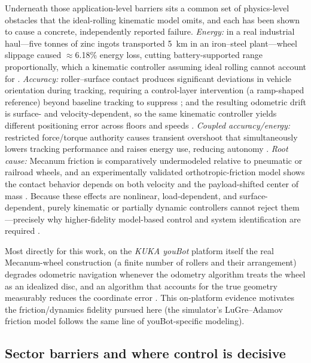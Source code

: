 \documentclass[11pt]{article}
\begin{document}
Underneath those application-level barriers sits a common set of physics-level
obstacles that the ideal-rolling kinematic model omits, and each has been shown to
cause a concrete, independently reported failure. \emph{Energy:} in a real
industrial haul---five tonnes of zinc ingots transported 5~km in an iron--steel
plant---wheel slippage caused $\approx$6.18\% energy loss, cutting battery-supported
range proportionally, which a kinematic controller assuming ideal rolling cannot
account for \cite{bayar2025battery}. \emph{Accuracy:} roller--surface contact
produces significant deviations in vehicle orientation during tracking, requiring a
control-layer intervention (a ramp-shaped reference) beyond baseline tracking to
suppress \cite{jmst2024slippage}; and the resulting odometric drift is
surface- and velocity-dependent, so the same kinematic controller yields different
positioning error across floors and speeds \cite{shahidi2021odometry}.
\emph{Coupled accuracy/energy:} restricted force/torque authority causes transient
overshoot that simultaneously lowers tracking performance and raises energy use,
reducing autonomy \cite{antipeaking2024}. \emph{Root cause:} Mecanum friction is
comparatively undermodeled relative to pneumatic or railroad wheels, and an
experimentally validated orthotropic-friction model shows the contact behavior
depends on both velocity and the payload-shifted center of mass
\cite{manzl2023orthotropic}. Because these effects are nonlinear, load-dependent,
and surface-dependent, purely kinematic or partially dynamic controllers cannot
reject them---precisely why higher-fidelity model-based control and system
identification are required \cite{li2025mecanumdob,avpsmo2024}.

Most directly for this work, on the \emph{KUKA youBot} platform itself the real
Mecanum-wheel construction (a finite number of rollers and their arrangement)
degrades odometric navigation whenever the odometry algorithm treats the wheel as
an idealized disc, and an algorithm that accounts for the true geometry measurably
reduces the coordinate error \cite{adamov2018youbot}. This on-platform evidence
motivates the friction/dynamics fidelity pursued here (the simulator's LuGre--Adamov
friction model follows the same line of youBot-specific modeling).

\subsection{Sector barriers and where control is decisive}
\label{sec:sector-barriers}
\end{document}
